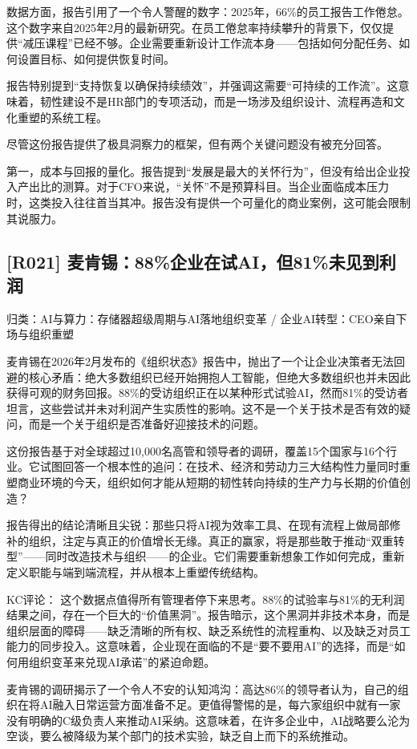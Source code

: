 \documentclass[11pt]{ctexart}
\begin{document}
数据方面，报告引用了一个令人警醒的数字：2025年，66\%的员工报告工作倦怠。这个数字来自2025年2月的最新研究。在员工倦怠率持续攀升的背景下，仅仅提供“减压课程”已经不够。企业需要重新设计工作流本身——包括如何分配任务、如何设置目标、如何提供恢复时间。

报告特别提到“支持恢复以确保持续绩效”，并强调这需要“可持续的工作流”。这意味着，韧性建设不是HR部门的专项活动，而是一场涉及组织设计、流程再造和文化重塑的系统工程。

尽管这份报告提供了极具洞察力的框架，但有两个关键问题没有被充分回答。

第一，成本与回报的量化。报告提到“发展是最大的关怀行为”，但没有给出企业投入产出比的测算。对于CFO来说，“关怀”不是预算科目。当企业面临成本压力时，这类投入往往首当其冲。报告没有提供一个可量化的商业案例，这可能会限制其说服力。

\subsection{[R021] 麦肯锡：88\%企业在试AI，但81\%未见到利润}
{\small\color{refgray}归类：AI与算力：存储器超级周期与AI落地组织变革 / 企业AI转型：CEO亲自下场与组织重塑}

麦肯锡在2026年2月发布的《组织状态》报告中，抛出了一个让企业决策者无法回避的核心矛盾：绝大多数组织已经开始拥抱人工智能，但绝大多数组织也并未因此获得可观的财务回报。88\%的受访组织正在以某种形式试验AI，然而81\%的受访者坦言，这些尝试并未对利润产生实质性的影响。这不是一个关于技术是否有效的疑问，而是一个关于组织是否准备好迎接技术的问题。

这份报告基于对全球超过10,000名高管和领导者的调研，覆盖15个国家与16个行业。它试图回答一个根本性的追问：在技术、经济和劳动力三大结构性力量同时重塑商业环境的今天，组织如何才能从短期的韧性转向持续的生产力与长期的价值创造？

报告得出的结论清晰且尖锐：那些只将AI视为效率工具、在现有流程上做局部修补的组织，注定与真正的价值增长无缘。真正的赢家，将是那些敢于推动“双重转型”——同时改造技术与组织——的企业。它们需要重新想象工作如何完成，重新定义职能与端到端流程，并从根本上重塑传统结构。

KC评论： 这个数据点值得所有管理者停下来思考。88\%的试验率与81\%的无利润结果之间，存在一个巨大的“价值黑洞”。报告暗示，这个黑洞并非技术本身，而是组织层面的障碍——缺乏清晰的所有权、缺乏系统性的流程重构、以及缺乏对员工能力的同步投入。这意味着，企业现在面临的不是“要不要用AI”的选择，而是“如何用组织变革来兑现AI承诺”的紧迫命题。

麦肯锡的调研揭示了一个令人不安的认知鸿沟：高达86\%的领导者认为，自己的组织在将AI融入日常运营方面准备不足。更值得警惕的是，每六家组织中就有一家没有明确的C级负责人来推动AI采纳。这意味着，在许多企业中，AI战略要么沦为空谈，要么被降级为某个部门的技术实验，缺乏自上而下的系统推动。
\end{document}
